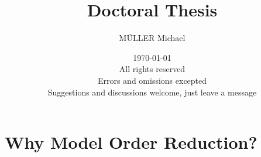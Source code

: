 \documentclass{scrartcl}
\begin{document}
\title{Doctoral Thesis}
\author{\uppercase{Müller} Michael}
\date{\today \\ All rights reserved\tcr \\ \centering Errors and omissions excepted \\ Suggestions and discussions welcome, just leave a message}

\maketitle









\section{Why Model Order Reduction?}
{}
\end{document}

